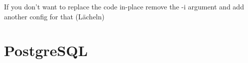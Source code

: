 


If you don't want to replace the code in-place remove the -i argument and add another config for that (Lächeln)



\section{PostgreSQL}



